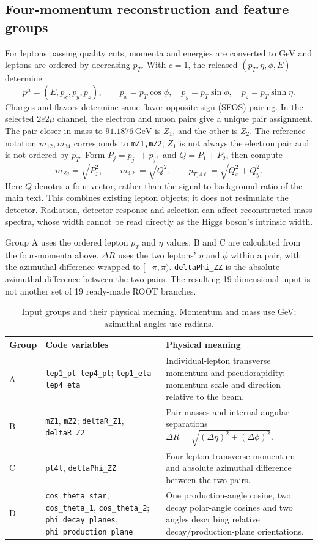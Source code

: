 \documentclass[11pt,a4paper]{article}
\newcommand{\gev}{\,\mathrm{GeV}}
\begin{document}
\subsection{Four-momentum reconstruction and feature groups}
For leptons passing quality cuts, momenta and energies are converted to GeV and leptons are ordered by decreasing $p_T$.
With $c=1$, the released $(p_T,\eta,\phi,E)$ determine
\[
 p^\mu=(E,p_x,p_y,p_z),\qquad
 p_x=p_T\cos\phi,\quad p_y=p_T\sin\phi,\quad p_z=p_T\sinh\eta.
\]
Charges and flavors determine same-flavor opposite-sign (SFOS) pairing.
In the selected $2e2\mu$ channel, the electron and muon pairs give a unique pair assignment.
The pair closer in mass to $91.1876\gev$ is $Z_1$, and the other is $Z_2$.
The reference notation $m_{12},m_{34}$ corresponds to \texttt{mZ1,mZ2}; $Z_1$ is not always the electron pair and is not ordered by $p_T$.
Form $P_j=p_{j^-}+p_{j^+}$ and $Q=P_1+P_2$, then compute
\[
 m_{Zj}=\sqrt{P_j^2},\qquad m_{4\ell}=\sqrt{Q^2},\qquad
 p_{T,4\ell}=\sqrt{Q_x^2+Q_y^2}.
\]
Here $Q$ denotes a four-vector, rather than the signal-to-background ratio of the main text.
This combines existing lepton objects; it does not resimulate the detector.
Radiation, detector response and selection can affect reconstructed mass spectra, whose width cannot be read directly as the Higgs boson's intrinsic width.

Group A uses the ordered lepton $p_T$ and $\eta$ values; B and C are calculated from the four-momenta above.
$\Delta R$ uses the two leptons' $\eta$ and $\phi$ within a pair, with the azimuthal difference wrapped to $[-\pi,\pi)$.
\texttt{deltaPhi\_ZZ} is the absolute azimuthal difference between the two pairs.
The resulting 19-dimensional input is not another set of 19 ready-made ROOT branches.
\begin{table}[H]
\caption{Input groups and their physical meaning. Momentum and mass use GeV; azimuthal angles use radians.}
\label{tab:features}
\small
\renewcommand{\arraystretch}{1.12}
\begin{tabularx}{\linewidth}{@{}p{.07\linewidth}p{.43\linewidth}Y@{}}
\toprule
Group & Code variables & Physical meaning \\
\midrule
A & \texttt{lep1\_pt}--\texttt{lep4\_pt}; \texttt{lep1\_eta}--\texttt{lep4\_eta} & Individual-lepton transverse momentum and pseudorapidity: momentum scale and direction relative to the beam. \\
B & \texttt{mZ1}, \texttt{mZ2}; \texttt{deltaR\_Z1}, \texttt{deltaR\_Z2} & Pair masses and internal angular separations $\Delta R=\sqrt{(\Delta\eta)^2+(\Delta\phi)^2}$. \\
C & \texttt{pt4l}, \texttt{deltaPhi\_ZZ} & Four-lepton transverse momentum and absolute azimuthal difference between the two pairs. \\
D & \texttt{cos\_theta\_star}, \texttt{cos\_theta\_1}, \texttt{cos\_theta\_2}; \texttt{phi\_decay\_planes}, \texttt{phi\_production\_plane} & One production-angle cosine, two decay polar-angle cosines and two angles describing relative decay/production-plane orientations. \\
\bottomrule
\end{tabularx}
\end{table}
\end{document}
